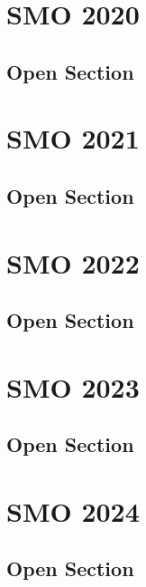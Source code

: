 \documentclass[a4paper,listof=totoc,bibliography=totoc,openany]{scrbook}
\begin{document}

\chapter{SMO 2020}
\section{Open Section}


\chapter{SMO 2021}
\section{Open Section}


\chapter{SMO 2022}
\section{Open Section}



\chapter{SMO 2023}
\section{Open Section}



\chapter{SMO 2024}
\section{Open Section}


\end{document}
